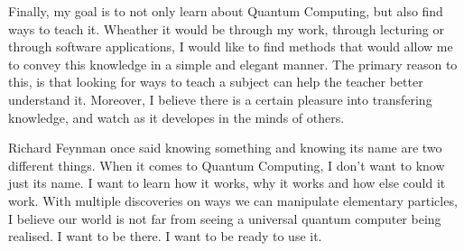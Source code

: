 \documentclass[a4paper,10pt]{article}
\begin{document}
Finally, my goal is to not only learn about Quantum Computing, but also find ways to teach it. Wheather it would be through my work, through lecturing
or through software applications, I would like to find methods that would allow me to convey this knowledge in a simple and elegant manner.
The primary reason to this, is that looking for ways to teach a subject can help the teacher better understand it. Moreover, I believe there is a certain
pleasure into transfering knowledge, and watch as it developes in the minds of others.

Richard Feynman once said knowing something and knowing its name are two different things.
When it comes to Quantum Computing, I don't want to know just its name. I want to learn how it works, why it works and how else could it work.
With multiple discoveries on ways we can manipulate elementary particles, I believe our world is not far from seeing a universal quantum computer being realised.
I want to be there. I want to be ready to use it.
\end{document}
